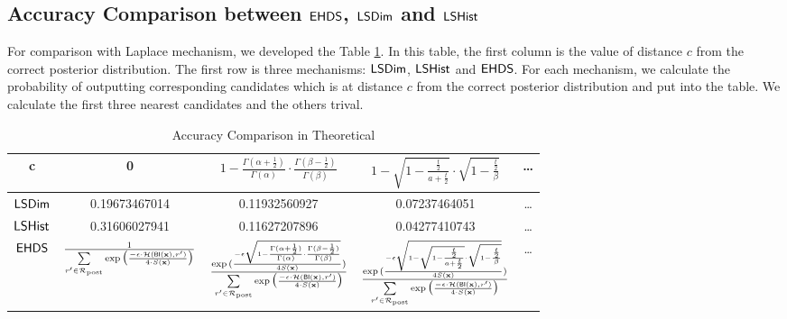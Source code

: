 \documentclass{article}
\begin{document}
\subsection{Accuracy Comparison between $\mathsf{EHDS}$, $\mathsf{LSDim}$ and $\mathsf{LSHist}$}
For comparison with Laplace mechanism, we developed the Table \ref{tab_acc_theo}. In this table, the first column is the value of distance $c$ from the correct posterior distribution. The first row is three mechanisms: $\mathsf{LSDim}$, $\mathsf{LSHist}$ and $\mathsf{EHDS}$. For each mechanism, we calculate the probability of outputting corresponding candidates which is at distance $c$ from the correct posterior distribution and put into the table. We calculate the first three nearest candidates and the others trival.
\begin{table}[t]
\scriptsize
\centering
\caption{Accuracy Comparison in Theoretical}
\label{tab_acc_theo}
\begin{tabular}{ |c|c|c|c|c| } 
\hline
 c & 0 
 & $1 - \frac{\Gamma(\alpha+\frac{1}{2})}{\Gamma(\alpha)} \cdot
    \frac{\Gamma(\beta - \frac{1}{2})}{\Gamma(\beta)}$
 & $1 - 
    \sqrt{1 - \frac{\frac{t}{2}}{a + \frac{t}{2}}}
    \cdot
    \sqrt{1 - \frac{\frac{t}{2}}{\beta}}$ & \dots  \\
 \hline
 $\mathsf{LSDim} $
 & 0.19673467014 & 0.11932560927 & 0.07237464051 & \dots \\
 \hline
 $\mathsf{LSHist} $
 & 0.31606027941 & 0.11627207896 & 0.04277410743 & \dots \\
 \hline
 $\mathsf{EHDS} $
 & $\frac{1}{\sum\limits_{r'\in \mathcal{R}_{\textup{post}}} \exp \big(\frac{-\epsilon\cdot \mathcal{H} (\mathsf{BI}(\textbf{x}),r')}{4 \cdot S(\textbf{x})}\big)}$
 & $\frac{\exp{(\frac{- \epsilon \sqrt{1 - \frac{\Gamma(\alpha+\frac{1}{2})}{\Gamma(\alpha)} \cdot
 \frac{\Gamma(\beta - \frac{1}{2})}{\Gamma(\beta)}}}{4 S(\textbf{x})})}}{\sum\limits_{r'\in \mathcal{R}_{\textup{post}}} \exp \big(\frac{-\epsilon\cdot \mathcal{H} (\mathsf{BI}(\textbf{x}),r')}{4 \cdot S(\textbf{x})}\big)}$
 & $\frac{\exp{(\frac{- \epsilon \sqrt{1 - 
    \sqrt{1 - \frac{\frac{t}{2}}{a + \frac{t}{2}}}
    \cdot
    \sqrt{1 - \frac{\frac{t}{2}}{\beta}}}}
    {4 S(\textbf{x})})}}{\sum\limits_{r'\in \mathcal{R}_{\textup{post}}} \exp \big(\frac{-\epsilon\cdot \mathcal{H} (\mathsf{BI}(\textbf{x}),r')}{4 \cdot S(\textbf{x})}\big)}$ & \dots\\
 \hline
\end{tabular}
\end{table}
\end{document}

